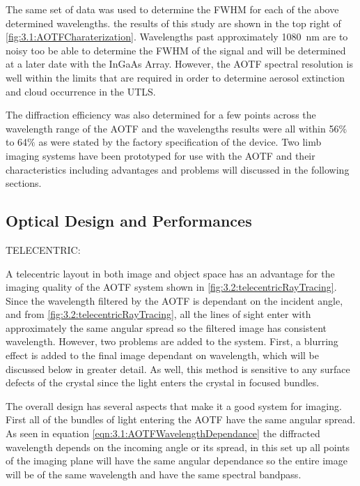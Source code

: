 \documentclass[12pt, draft]{article}
\begin{document}
The same set of data was used to determine the FWHM for each of the above determined wavelengths. the results of this study are shown in the top right of \autoref{fig:3.1:AOTFCharaterization}. Wavelengths past approximately 1080~nm are to noisy too be able to determine the FWHM of the signal and will be determined at a later date with the InGaAs Array. However, the AOTF spectral resolution is well within the limits that are required in order to determine aerosol extinction and cloud occurrence in the UTLS.

The diffraction efficiency was also determined for a few points across the wavelength range of the AOTF and the wavelengths results were all within 56$\%$ to 64$\%$ as were stated by the factory specification of the device. Two limb imaging systems have been prototyped for use with the AOTF and their characteristics including advantages and problems will discussed in the following sections.

\subsection{Optical Design and Performances}

TELECENTRIC:

A telecentric layout in both image and object space has an advantage for the imaging quality of the AOTF system shown in \autoref{fig:3.2:telecentricRayTracing}. Since the wavelength filtered by the AOTF is dependant on the incident angle, and from \autoref{fig:3.2:telecentricRayTracing}, all the lines of sight enter with approximately the same angular spread so the filtered image has consistent wavelength. However, two problems are added to the system. First, a blurring effect is added to the final image dependant on wavelength, which will be discussed below in greater detail. As well, this method is sensitive to any surface defects of the crystal since the light enters the crystal in focused bundles.

The overall design has several aspects that make it a good system for imaging. First all of the bundles of light entering the AOTF have the same angular spread. As seen in equation \autoref{eqn:3.1:AOTFWavelengthDependance} the diffracted wavelength depends on the incoming angle or its spread, in this set up all points of the imaging plane will have the same angular dependance so the entire image will be of the same wavelength and have the same spectral bandpass.

\end{document}
